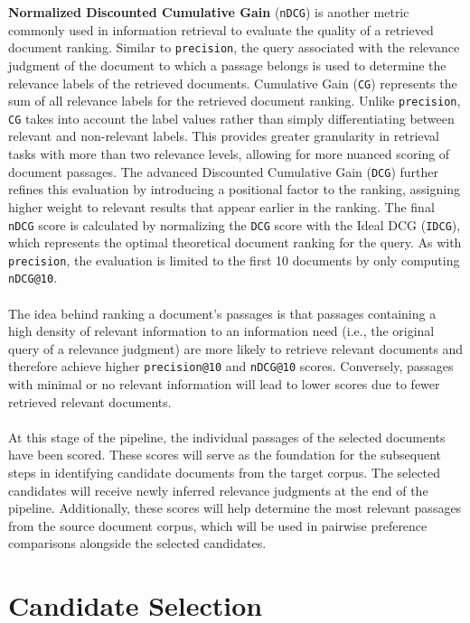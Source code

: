 \textbf{Normalized Discounted Cumulative Gain} (\texttt{nDCG}) is another metric commonly used in information retrieval to evaluate the quality of a retrieved document ranking. Similar to \texttt{precision}, the query associated with the relevance judgment of the document to which a passage belongs is used to determine the relevance labels of the retrieved documents. Cumulative Gain (\texttt{CG}) represents the sum of all relevance labels for the retrieved document ranking. Unlike \texttt{precision}, \texttt{CG} takes into account the label values rather than simply differentiating between relevant and non-relevant labels. This provides greater granularity in retrieval tasks with more than two relevance levels, allowing for more nuanced scoring of document passages. The advanced Discounted Cumulative Gain (\texttt{DCG}) further refines this evaluation by introducing a positional factor to the ranking, assigning higher weight to relevant results that appear earlier in the ranking. The final \texttt{nDCG} score is calculated by normalizing the \texttt{DCG} score with the Ideal DCG (\texttt{IDCG}), which represents the optimal theoretical document ranking for the query. As with \texttt{precision}, the evaluation is limited to the first 10 documents by only computing \texttt{nDCG@10}.
\\\\
The idea behind ranking a document's passages is that passages containing a high density of relevant information to an information need (i.e., the original query of a relevance judgment) are more likely to retrieve relevant documents and therefore achieve higher \texttt{precision@10} and \texttt{nDCG@10} scores. Conversely, passages with minimal or no relevant information will lead to lower scores due to fewer retrieved relevant documents.
\\\\
At this stage of the pipeline, the individual passages of the selected documents have been scored. These scores will serve as the foundation for the subsequent steps in identifying candidate documents from the target corpus. The selected candidates will receive newly inferred relevance judgments at the end of the pipeline. Additionally, these scores will help determine the most relevant passages from the source document corpus, which will be used in pairwise preference comparisons alongside the selected candidates.


\section{Candidate Selection}\label{candidate-selection}

